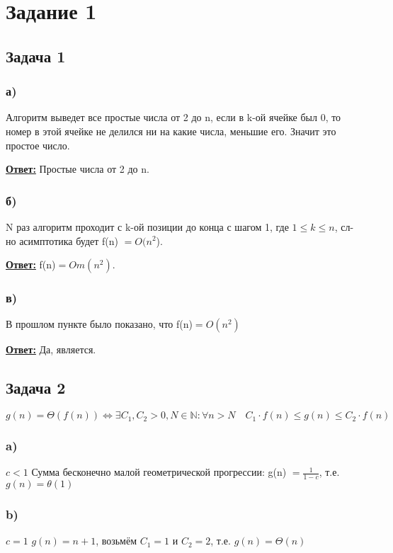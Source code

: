 \documentclass[a4paper,14pt]{article} %
\begin{document}

\section{Задание 1}
\subsection{Задача 1}
\subsubsection*{а)}
Алгоритм выведет все простые числа от 2 до n, если в k-ой ячейке был 0, то номер в этой ячейке не делился ни на какие числа, меньшие его. Значит это простое число.

\underline{\textbf{Ответ:}} Простые числа от 2 до n.

\subsubsection*{б)} N раз алгоритм проходит с k-ой позиции до конца с шагом 1, где $1 \leq k \leq n$, сл-но асимптотика будет f(n) $= O(n^2$).

\underline{\textbf{Ответ:}} f(n)$ = Om(n^2)$.

\subsubsection*{в)} В прошлом пункте было показано, что f(n)$ = O(n^2)$

\underline{\textbf{Ответ:}} Да, является.

\subsection{Задача 2}
$g(n) = \Theta (f(n)) \Leftrightarrow \exists C_1, C_2 > 0, N \in \mathbb{N} : \forall n > N \quad C_1 \cdot f(n) \leqslant g(n) \leqslant C_2 \cdot f(n) $

\subsubsection*{a)} $c < 1$	
\newline
Сумма бесконечно малой геометрической прогрессии: g(n) $= \frac{1}{1-c}$, 
т.е. $g(n) = \theta(1)$

\subsubsection*{b)} $c = 1$
\newline	
$g(n) = n + 1$, возьмём $C_1 = 1$ и $C_2 = 2$, т.е. $g(n) = \Theta(n)$
\end{document}
